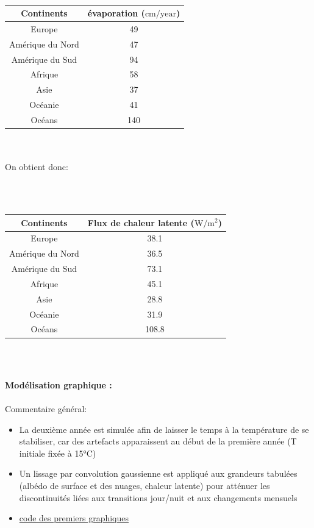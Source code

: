 \documentclass[a4paper,12pt]{article}
\begin{document}
\\

\begin{tabular}{|c|c|}
\hline
Continents & évaporation ($\mathrm{cm/year}$) \\
\hline
Europe & 49 \\
\hline
Amérique du Nord & 47 \\
\hline
Amérique du Sud & 94 \\
\hline
Afrique & 58 \\
\hline
Asie & 37 \\
\hline
Océanie & 41 \\
\hline
Océans & 140 \\
\hline
\end{tabular}
\\

\\
On obtient donc:

\\
\vspace{0,5cm}
\\
\begin{tabular}{|c|c|}
\hline
Continents & Flux de chaleur latente ($\mathrm{W/m^2}$) \\
\hline
Europe & 38.1 \\
\hline
Amérique du Nord & 36.5 \\
\hline
Amérique du Sud & 73.1 \\
\hline
Afrique & 45.1 \\
\hline
Asie & 28.8 \\
\hline
Océanie & 31.9 \\
\hline
Océans & 108.8 \\
\hline
\end{tabular}
\\
\\

\textbf{Modélisation graphique : }
\\
\\
Commentaire général: 
\begin{itemize}
    \item La deuxième année est simulée afin de laisser le temps à la température de se stabiliser, car des artefacts apparaissent au début de la première année (T initiale fixée à 15°C)
    \item Un lissage par convolution gaussienne est appliqué aux grandeurs tabulées (albédo de surface et des nuages, chaleur latente) pour atténuer les discontinuités liées aux transitions jour/nuit et aux changements mensuels
    \item \href{https://github.com/pierrelouis-cmrt/CREPES/blob/main/modele4/code/modele_courbe.py}{code des premiers graphiques}
\end{itemize}
\end{document}
